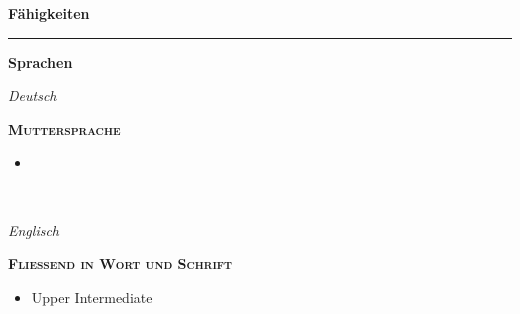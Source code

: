 \documentclass[8pt]{article}
\newcommand{\cvSection}[1]{
  \medskip
  {\Large \color{cvColor} \textbf{#1}}\\
  \parbox{\linewidth}{\rule{\linewidth}{1pt}}
  \par
}
\newcommand{\cvEducationHeading}[2]{%
  {\centering\colorbox{cvBackgroundColor}{\parbox{0.98\linewidth}{\textbf{#1} \hfill \textit{\footnotesize #2}}}} \par
}
\newcommand{\cvItem}[2]{%
  \begin{minipage}[t]{0.15\linewidth}
    \raggedleft%
    #1
  \end{minipage}
  \hspace{0.02\linewidth}
  \vrule
  \hspace{0.02\linewidth}
  \begin{minipage}[t]{0.75\linewidth}
    #2
  \end{minipage}\newline
}
\newenvironment{cvEducationItem}[2]{
  \medskip
  \par
  \begin{minipage}[c]{0.15\linewidth}
    \raggedleft
    \footnotesize
    \textit{#1}
  \end{minipage}
  \quad
  \vrule
  \quad
  \begin{minipage}[t]{0.7\linewidth}
    \textsc{\color{cvColor} \textbf{#2}}
    \footnotesize
    \begin{itemize}[itemsep=0mm, leftmargin=3mm]
}{
    \end{itemize}
  \end{minipage}
  \\[0.5em]
}
\newenvironment{cvSkillsItem}[1]{
  \cvEducationHeading{#1}{}
  \renewcommand{\item}[2]{%
    \begin{minipage}[t]{0.1\textwidth}
      \raggedleft
      \small
      ##1
    \end{minipage}
    \quad
    \vrule
    \quad
    \begin{minipage}[t]{0.35\textwidth}
      \footnotesize
      ##2
    \end{minipage}
    \\
  }
}{
}
\begin{document}
  \cvSection{Fähigkeiten}


  \cvEducationHeading{Sprachen}{}
  \begin{multicols}{2}
  \begin{cvEducationItem}{Deutsch}{Muttersprache}
    \item
  \end{cvEducationItem}
  \begin{cvEducationItem}{Englisch}{Fließend in Wort und Schrift}
    \item Upper Intermediate
  \end{cvEducationItem}
  \end{multicols}
\end{document}

